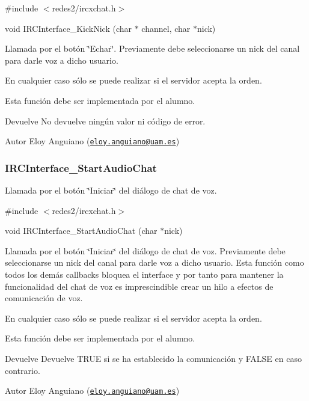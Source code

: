 \#include $<$redes2/ircxchat.\-h$>$

void I\-R\-C\-Interface\-\_\-\-Kick\-Nick (char $\ast$ channel, char $\ast$nick)

Llamada por el botón \char`\"{}\-Echar\char`\"{}. Previamente debe seleccionarse un nick del canal para darle voz a dicho usuario.

En cualquier caso sólo se puede realizar si el servidor acepta la orden.

Esta función debe ser implementada por el alumno.

\begin{DoxyReturn}{Devuelve}
No devuelve ningún valor ni código de error.
\end{DoxyReturn}
\begin{DoxyAuthor}{Autor}
Eloy Anguiano (\href{mailto:eloy.anguiano@uam.es}{\tt eloy.\-anguiano@uam.\-es})
\end{DoxyAuthor}


 \hypertarget{IRCInterface_StartAudioChat}{}\subsubsection{I\-R\-C\-Interface\-\_\-\-Start\-Audio\-Chat}\label{IRCInterface_StartAudioChat}
Llamada por el botón \char`\"{}\-Iniciar\char`\"{} del diálogo de chat de voz.

\#include $<$redes2/ircxchat.\-h$>$

void I\-R\-C\-Interface\-\_\-\-Start\-Audio\-Chat (char $\ast$nick)

Llamada por el botón \char`\"{}\-Iniciar\char`\"{} del diálogo de chat de voz. Previamente debe seleccionarse un nick del canal para darle voz a dicho usuario. Esta función como todos los demás callbacks bloquea el interface y por tanto para mantener la funcionalidad del chat de voz es imprescindible crear un hilo a efectos de comunicación de voz.

En cualquier caso sólo se puede realizar si el servidor acepta la orden.

Esta función debe ser implementada por el alumno.

\begin{DoxyReturn}{Devuelve}
Devuelve T\-R\-U\-E si se ha establecido la comunicación y F\-A\-L\-S\-E en caso contrario.
\end{DoxyReturn}
\begin{DoxyAuthor}{Autor}
Eloy Anguiano (\href{mailto:eloy.anguiano@uam.es}{\tt eloy.\-anguiano@uam.\-es})
\end{DoxyAuthor}


